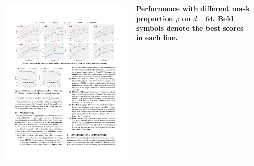 \documentclass[25pt, a0paper, portrait, margin=0mm, innermargin=0pt, blockverticalspace=0mm, colspace=0mm, subcolspace=0mm]{tikzposter} %
\begin{document}
\begin{columns}
{\begin{minipage}{0.9\linewidth}
        \begin{tikzfigure}
            \centering
             \includegraphics[scale=2.4]{mask_proportion}
        \end{tikzfigure}
        \centering
        \parbox{0.9\linewidth}{\bfseries \small Performance with different mask proportion $\rho$ on $d=64$. Bold symbols denote the best scores in each line.}
        \end{minipage}
    }

\end{columns}
\end{document}

